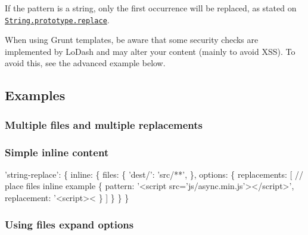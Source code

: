 \begin{DoxyItemize}
\item If the pattern is a string, only the first occurrence will be replaced, as stated on \href{http://www.ecma-international.org/ecma-262/5.1/#sec-15.5.4.11}{\tt String.\+prototype.\+replace}.
\item When using Grunt templates, be aware that some security checks are implemented by Lo\+Dash and may alter your content (mainly to avoid X\+SS). To avoid this, see the advanced example below.
\end{DoxyItemize}

\subsection*{Examples}

\subsubsection*{Multiple files and multiple replacements}




\subsubsection*{Simple inline content}


\begin{DoxyCode}
'string-replace': \{
  inline: \{
    files: \{
      'dest/': 'src/**',
    \},
    options: \{
      replacements: [
        // place files inline example
        \{
          pattern: '<script src='js/async.min.js'></script>',
          replacement: '<script><%
        \}
      ]
    \}
  \}
\}
\end{DoxyCode}


\subsubsection*{Using files\textquotesingle{} expand options}

